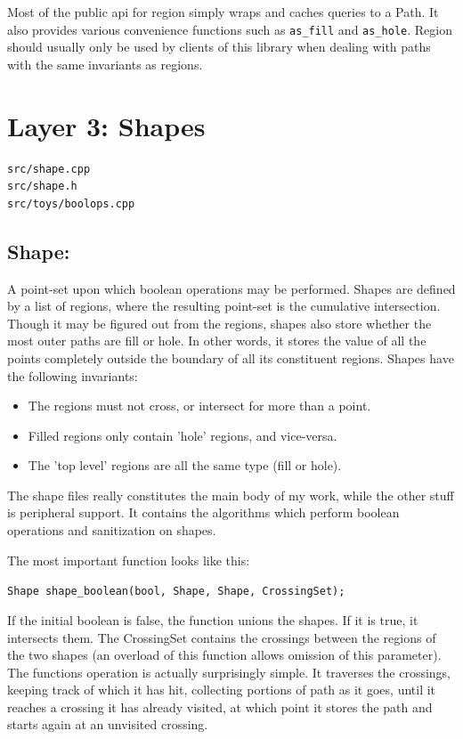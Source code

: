\documentclass[openany]{book}
\begin{document}
Most of the public api for region simply wraps and caches queries to a Path. It also provides various convenience functions such as \verb|as_fill| and \verb|as_hole|. Region should usually only be used by clients of this library when dealing with paths with the same invariants as regions.
\section{Layer 3: Shapes}

\begin{verbatim}
src/shape.cpp
src/shape.h
src/toys/boolops.cpp
\end{verbatim}

\subsection{Shape:}
A point-set upon which boolean operations may be performed. Shapes are defined by a list of regions, where the resulting point-set is the cumulative intersection. Though it may be figured out from the regions, shapes also store whether the most outer paths are fill or hole. In other words, it stores the value of all the points completely outside the boundary of all its constituent regions. Shapes have the following invariants:

\begin{itemize}
\item{ The regions must not cross, or intersect for more than a point.}
\item{ Filled regions only contain 'hole' regions, and vice-versa.}
\item{ The 'top level' regions are all the same type (fill or hole).}
\end{itemize}

The shape files really constitutes the main body of my work, while the other stuff is peripheral support. It contains the algorithms which perform boolean operations and sanitization on shapes.

The most important function looks like this:

\verb|Shape shape_boolean(bool, Shape, Shape, CrossingSet);|

If the initial boolean is false, the function unions the shapes. If it is true, it intersects them. The CrossingSet contains the crossings between the regions of the two shapes (an overload of this function allows omission of this parameter). The functions operation is actually surprisingly simple. It traverses the crossings, keeping track of which it has hit, collecting portions of path as it goes, until it reaches a crossing it has already visited, at which point it stores the path and starts again at an unvisited crossing.
\end{document}
